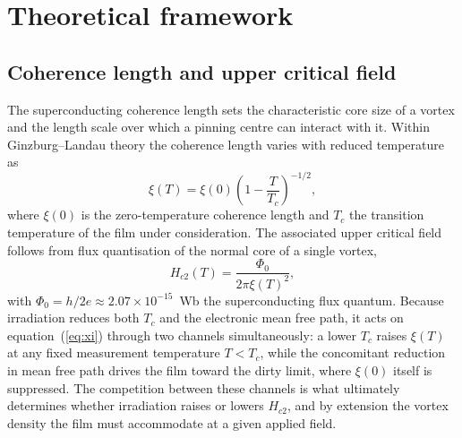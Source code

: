 \section{Theoretical framework}
\label{sec:theory}

\subsection{Coherence length and upper critical field}
The superconducting coherence length sets the characteristic core size of a vortex and the length scale over which a pinning centre can interact with it. Within Ginzburg--Landau theory \cite{ginzburglandau1950} the coherence length varies with reduced temperature as
\begin{equation}
\xi(T) = \xi(0)\left(1-\frac{T}{T_c}\right)^{-1/2},
\label{eq:xi}
\end{equation}
where $\xi(0)$ is the zero-temperature coherence length and $T_c$ the transition temperature of the film under consideration. The associated upper critical field follows from flux quantisation of the normal core of a single vortex,
\begin{equation}
H_{c2}(T) = \frac{\Phi_0}{2\pi\xi(T)^2},
\label{eq:hc2}
\end{equation}
with $\Phi_0 = h/2e \approx 2.07\times10^{-15}$~Wb the superconducting flux quantum. Because irradiation reduces both $T_c$ and the electronic mean free path, it acts on equation~(\ref{eq:xi}) through two channels simultaneously: a lower $T_c$ raises $\xi(T)$ at any fixed measurement temperature $T<T_c$, while the concomitant reduction in mean free path drives the film toward the dirty limit, where $\xi(0)$ itself is suppressed. The competition between these channels is what ultimately determines whether irradiation raises or lowers $H_{c2}$, and by extension the vortex density the film must accommodate at a given applied field.

